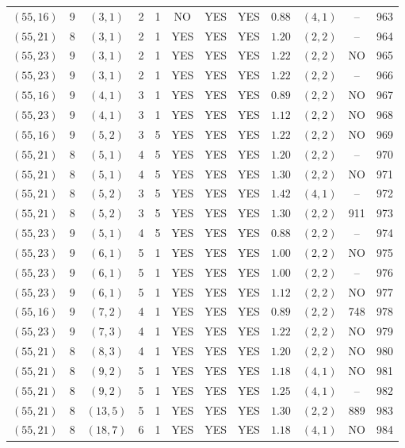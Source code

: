 \begin{longtable}{|c|c|c|c|c|c|c|c|c|c|c|c|}
$(55,16)$ & 9 & $(3,1)$ & 2 & 1 & NO & YES & YES & $0.88$ & $(4,1)$ & -- & 963\\
$(55,21)$ & 8 & $(3,1)$ & 2 & 1 & YES & YES & YES & $1.20$ & $(2,2)$ & -- & 964\\
$(55,23)$ & 9 & $(3,1)$ & 2 & 1 & YES & YES & YES & $1.22$ & $(2,2)$ & NO & 965\\
$(55,23)$ & 9 & $(3,1)$ & 2 & 1 & YES & YES & YES & $1.22$ & $(2,2)$ & -- & 966\\
$(55,16)$ & 9 & $(4,1)$ & 3 & 1 & YES & YES & YES & $0.89$ & $(2,2)$ & NO & 967\\
$(55,23)$ & 9 & $(4,1)$ & 3 & 1 & YES & YES & YES & $1.12$ & $(2,2)$ & NO & 968\\
$(55,16)$ & 9 & $(5,2)$ & 3 & 5 & YES & YES & YES & $1.22$ & $(2,2)$ & NO & 969\\
$(55,21)$ & 8 & $(5,1)$ & 4 & 5 & YES & YES & YES & $1.20$ & $(2,2)$ & -- & 970\\
$(55,21)$ & 8 & $(5,1)$ & 4 & 5 & YES & YES & YES & $1.30$ & $(2,2)$ & NO & 971\\
$(55,21)$ & 8 & $(5,2)$ & 3 & 5 & YES & YES & YES & $1.42$ & $(4,1)$ & -- & 972\\
$(55,21)$ & 8 & $(5,2)$ & 3 & 5 & YES & YES & YES & $1.30$ & $(2,2)$ & 911 & 973\\
$(55,23)$ & 9 & $(5,1)$ & 4 & 5 & YES & YES & YES & $0.88$ & $(2,2)$ & -- & 974\\
$(55,23)$ & 9 & $(6,1)$ & 5 & 1 & YES & YES & YES & $1.00$ & $(2,2)$ & NO & 975\\
$(55,23)$ & 9 & $(6,1)$ & 5 & 1 & YES & YES & YES & $1.00$ & $(2,2)$ & -- & 976\\
$(55,23)$ & 9 & $(6,1)$ & 5 & 1 & YES & YES & YES & $1.12$ & $(2,2)$ & NO & 977\\
$(55,16)$ & 9 & $(7,2)$ & 4 & 1 & YES & YES & YES & $0.89$ & $(2,2)$ & 748 & 978\\
$(55,23)$ & 9 & $(7,3)$ & 4 & 1 & YES & YES & YES & $1.22$ & $(2,2)$ & NO & 979\\
$(55,21)$ & 8 & $(8,3)$ & 4 & 1 & YES & YES & YES & $1.20$ & $(2,2)$ & NO & 980\\
$(55,21)$ & 8 & $(9,2)$ & 5 & 1 & YES & YES & YES & $1.18$ & $(4,1)$ & NO & 981\\
$(55,21)$ & 8 & $(9,2)$ & 5 & 1 & YES & YES & YES & $1.25$ & $(4,1)$ & -- & 982\\
$(55,21)$ & 8 & $(13,5)$ & 5 & 1 & YES & YES & YES & $1.30$ & $(2,2)$ & 889 & 983\\
$(55,21)$ & 8 & $(18,7)$ & 6 & 1 & YES & YES & YES & $1.18$ & $(4,1)$ & NO & 984\\

\end{longtable}
